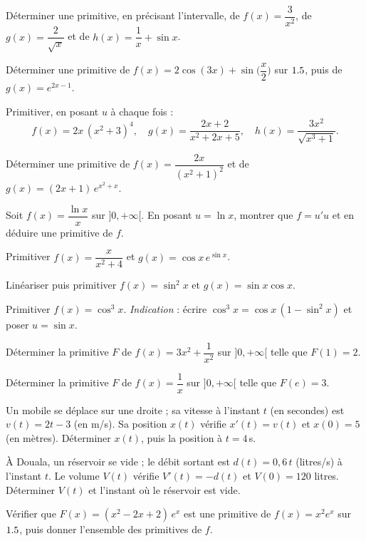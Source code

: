 \exo{} Déterminer une primitive, en précisant l'intervalle, de
$f(x)=\dfrac3{x^{2}}$, de $g(x)=\dfrac2{\sqrt x}$ et de $h(x)=\dfrac1x+\sin x$.

\exo{} Déterminer une primitive de $f(x)=2\cos(3x)+\sin\!\Big(\dfrac x2\Big)$ sur $1.5$,
puis de $g(x)=e^{2x-1}$.


\exo{} Primitiver, en posant $u$ à chaque fois :
\[
f(x)=2x\,(x^{2}+3)^{4},\quad g(x)=\frac{2x+2}{x^{2}+2x+5},\quad h(x)=\frac{3x^{2}}{\sqrt{x^{3}+1}}.
\]

\exo{} Déterminer une primitive de $f(x)=\dfrac{2x}{(x^{2}+1)^{2}}$
et de $g(x)=(2x+1)\,e^{x^{2}+x}$.

\exo{} Soit $f(x)=\dfrac{\ln x}{x}$ sur $]0,+\infty[$.
En posant $u=\ln x$, montrer que $f=u'u$ et en déduire une primitive de $f$.

\exo{} Primitiver $f(x)=\dfrac{x}{x^{2}+4}$ et $g(x)=\cos x\,e^{\sin x}$.


\exo{} Linéariser puis primitiver $f(x)=\sin^{2}x$ et $g(x)=\sin x\cos x$.

\exo{} Primitiver $f(x)=\cos^{3}x$.
\emph{Indication} : écrire $\cos^{3}x=\cos x\,(1-\sin^{2}x)$ et poser $u=\sin x$.


\exo{} Déterminer la primitive $F$ de $f(x)=3x^{2}+\dfrac1{x^{2}}$ sur $]0,+\infty[$
telle que $F(1)=2$.

\exo{} Déterminer la primitive $F$ de $f(x)=\dfrac{1}{x}$ sur $]0,+\infty[$ telle que
$F(e)=3$.

\exo{} Un mobile se déplace sur une droite ; sa vitesse à l'instant $t$ (en secondes)
est $v(t)=2t-3$ (en m/s). Sa position $x(t)$ vérifie $x'(t)=v(t)$ et $x(0)=5$ (en mètres).
Déterminer $x(t)$, puis la position à $t=4$\,s.

\exo{} À Douala, un réservoir se vide ; le débit sortant est $d(t)=0{,}6\,t$ (litres/s)
à l'instant $t$. Le volume $V(t)$ vérifie $V'(t)=-d(t)$ et $V(0)=120$ litres.
Déterminer $V(t)$ et l'instant où le réservoir est vide.


\exo{} Vérifier que $F(x)=(x^{2}-2x+2)\,e^{x}$ est une primitive de $f(x)=x^{2}e^{x}$ sur $1.5$,
puis donner l'ensemble des primitives de $f$.

